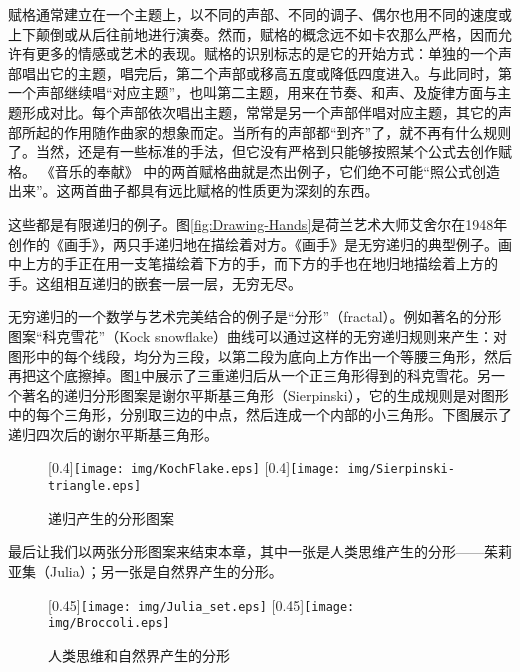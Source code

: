 \documentclass{article}
\begin{document}
赋格通常建立在一个主题上，以不同的声部、不同的调子、偶尔也用不同的速度或上下颠倒或从后往前地进行演奏。然而，赋格的概念远不如卡农那么严格，因而允许有更多的情感或艺术的表现。赋格的识别标志的是它的开始方式：单独的一个声部唱出它的主题，唱完后，第二个声部或移高五度或降低四度进入。与此同时，第一个声部继续唱“对应主题”，也叫第二主题，用来在节奏、和声、及旋律方面与主题形成对比。每个声部依次唱出主题，常常是另一个声部伴唱对应主题，其它的声部所起的作用随作曲家的想象而定。当所有的声部都“到齐”了，就不再有什么规则了。当然，还是有一些标准的手法，但它没有严格到只能够按照某个公式去创作赋格。 《音乐的奉献》 中的两首赋格曲就是杰出例子，它们绝不可能“照公式创造出来”。这两首曲子都具有远比赋格的性质更为深刻的东西\cite{GEB}。

这些都是有限递归的例子。图\ref{fig:Drawing-Hands}是荷兰艺术大师艾舍尔在1948年创作的《画手》，两只手递归地在描绘着对方。《画手》是无穷递归的典型例子。画中上方的手正在用一支笔描绘着下方的手，而下方的手也在地归地描绘着上方的手。这组相互递归的嵌套一层一层，无穷无尽。

无穷递归的一个数学与艺术完美结合的例子是“分形”（fractal）。例如著名的分形图案“科克雪花”（Kock snowflake）曲线可以通过这样的无穷递归规则来产生：对图形中的每个线段，均分为三段，以第二段为底向上方作出一个等腰三角形，然后再把这个底擦掉。图\ref{fig:fractal}中展示了三重递归后从一个正三角形得到的科克雪花。另一个著名的递归分形图案是谢尔平斯基三角形（Sierpinski），它的生成规则是对图形中的每个三角形，分别取三边的中点，然后连成一个内部的小三角形。下图展示了递归四次后的谢尔平斯基三角形。

\begin{figure}[htbp]
 \centering
 [0.4\linewidth]{\texttt{[image: img/KochFlake.eps]}}
 [0.4\linewidth]{\texttt{[image: img/Sierpinski-triangle.eps]}}
 \caption{递归产生的分形图案}
 \label{fig:fractal}
\end{figure}

最后让我们以两张分形图案来结束本章，其中一张是人类思维产生的分形——茱莉亚集（Julia）；另一张是自然界产生的分形。

\begin{figure}[htbp]
 \centering
 [0.45\linewidth]{\texttt{[image: img/Julia\_set.eps]}}
 [0.45\linewidth]{\texttt{[image: img/Broccoli.eps]}}
 \caption{人类思维和自然界产生的分形}
 \label{fig:more-fractal}
\end{figure}
\end{document}
